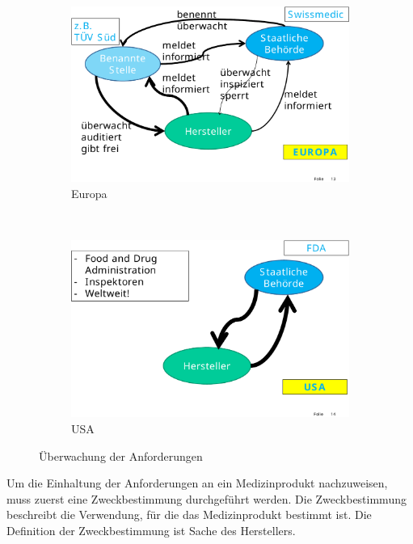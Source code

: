 \begin{figure}
	\centering
	\begin{subfigure}[b]{0.3\textwidth}
		\includegraphics[width=\textwidth]{fig/anforderungen-europa}
		\caption{Europa}
	\end{subfigure}
	~
	\begin{subfigure}[b]{0.3\textwidth}
		\includegraphics[width=\textwidth]{fig/anforderungen-usa}
		\caption{USA}
	\end{subfigure}
	\caption{Überwachung der Anforderungen}
	\label{fig:ueberwachung-anforderungen}
\end{figure}

Um die Einhaltung der Anforderungen an ein Medizinprodukt nachzuweisen, muss zuerst eine Zweckbestimmung durchgeführt werden. Die Zweckbestimmung beschreibt die Verwendung, für die das Medizinprodukt bestimmt ist. Die Definition der Zweckbestimmung ist Sache des Herstellers.

